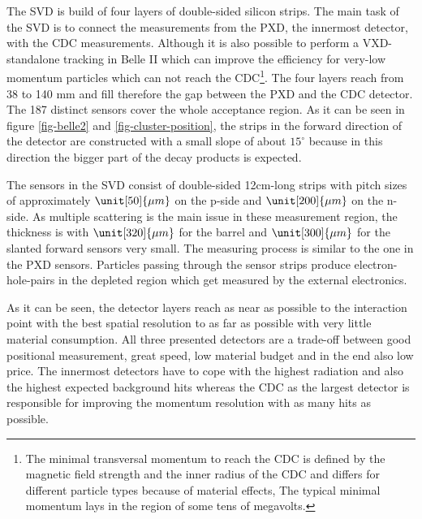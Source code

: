 The SVD is build of four layers of double-sided silicon strips. The main task of the SVD is to connect the measurements from the PXD, the innermost detector, with the CDC measurements. Although it is also possible to perform a VXD-standalone tracking in Belle II which can improve the efficiency for very-low momentum particles which can not reach the CDC\footnote{The minimal transversal momentum to reach the CDC is defined by the magnetic field strength and the inner radius of the CDC and differs for different particle types because of material effects, The typical minimal momentum lays in the region of some tens of megavolts.}. The four layers reach from 38 to 140 mm and fill therefore the gap between the PXD and the CDC detector. The 187 distinct sensors cover the whole acceptance region. As it can be seen in figure \ref{fig-belle2} and \ref{fig-cluster-position}, the strips in the forward direction of the detector are constructed with a small slope of about $15^\circ$ because in this direction the bigger part of the decay products is expected. 

The sensors in the SVD consist of double-sided 12cm-long strips with pitch sizes of approximately $\unit[50]{\mu m}$ on the p-side and $\unit[200]{\mu m}$ on the n-side. As multiple scattering is the main issue in these measurement region, the thickness is with $\unit[320]{\mu m}$ for the barrel and $\unit[300]{\mu m}$ for the slanted forward sensors very small. The measuring process is similar to the one in the PXD sensors. Particles passing through the sensor strips produce electron-hole-pairs in the depleted region which get measured by the external electronics. 

As it can be seen, the detector layers reach as near as possible to the interaction point with the best spatial resolution to as far as possible with very little material consumption. All three presented detectors are a trade-off between good positional measurement, great speed, low material budget and in the end also low price. The innermost detectors have to cope with the highest radiation and also the highest expected background hits whereas the CDC as the largest detector is responsible for improving the momentum resolution with as many hits as possible.
